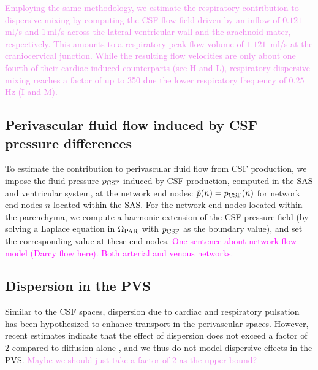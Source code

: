 \documentclass[fleqn,10pt]{wlscirep}
\newcommand{\mer}[1]{\textcolor{magenta}{#1}}
\newcommand{\mar}[1]{\textcolor{violet}{#1}}
\begin{document}
\mar{Employing the same methodology, we estimate the respiratory contribution to dispersive mixing by computing the CSF flow field driven by an inflow of $0.121\,$ml/s \cite{liu2024using} and $1\,$ml/s \cite{gutierrez2022effect} across the lateral ventricular wall and the arachnoid mater, respectively. This amounts to a respiratory peak flow volume of $1.121\,$ ml/s at the craniocervical junction. While the resulting flow velocities are only about one fourth of their cardiac-induced counterparts (see \Cref{fig:csf}H and L), respiratory dispersive mixing reaches a factor of up to 350 due the lower respiratory frequency of $0.25\,$Hz (\Cref{fig:csf}I and M).}

\subsection*{Perivascular fluid flow induced by CSF pressure differences}

To estimate the contribution to perivascular fluid flow from CSF
production, we impose the fluid pressure $p_{\rm CSF}$ induced by CSF
production, computed in the SAS and ventricular system, at the network
end nodes: $\hat{p}(n) = p_{\rm CSF}(n)$ for network end nodes $n$
located within the SAS. For the network end nodes located within the
parenchyma, we compute a harmonic extension of the CSF pressure field
(by solving a Laplace equation in $\Omega_{\rm PAR}$ with $p_{\rm
  CSF}$ as the boundary value), and set the corresponding value at
these end nodes. \mer{One sentence about network flow model (Darcy
  flow here). Both arterial and venous networks.}



\subsection*{Dispersion in the PVS}

Similar to the CSF spaces, dispersion due to cardiac and respiratory pulsation has been hypothesized to enhance transport in the perivascular spaces. However, recent estimates indicate that the effect of dispersion does not exceed a factor of 2 compared to diffusion alone \cite{asgari2016glymphatic,keith2019dispersion,bojarskaite2023sleep,asgari2016glymphatic,troyetsky2021dispersion}, and we thus do not model dispersive effects in the PVS. 
\mar{Maybe we should just take a factor of 2 as the upper bound?}
\end{document}
